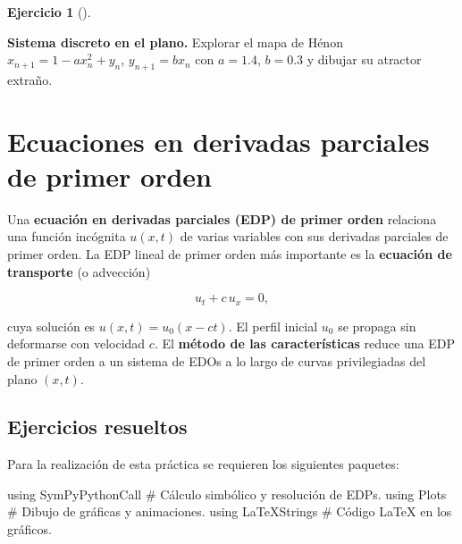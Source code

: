 \documentclass[
  spanish,
  a4paper,
]{scrreport}
\newenvironment{Shaded}{\begin{snugshade}}{\end{snugshade}}
\newcommand{\BuiltInTok}[1]{\textcolor[rgb]{0.00,0.23,0.31}{#1}}
\newcommand{\CommentTok}[1]{\textcolor[rgb]{0.37,0.37,0.37}{#1}}
\newcommand{\ImportTok}[1]{\textcolor[rgb]{0.00,0.46,0.62}{#1}}
\theoremstyle{definition}
\newtheorem{exercise}{Ejercicio}[chapter]
\theoremstyle{remark}
\begin{document}
\begin{exercise}[]\protect\hypertarget{exr-propuesto-henon}{}\label{exr-propuesto-henon}

\textbf{Sistema discreto en el plano.} Explorar el mapa de Hénon
\(x_{n+1} = 1 - a x_n^2 + y_n\), \(y_{n+1} = b x_n\) con \(a = 1.4\),
\(b = 0.3\) y dibujar su atractor extraño.

\end{exercise}


\chapter{Ecuaciones en derivadas parciales de primer
orden}\label{ecuaciones-en-derivadas-parciales-de-primer-orden}

Una \textbf{ecuación en derivadas parciales (EDP) de primer orden}
relaciona una función incógnita \(u(x, t)\) de varias variables con sus
derivadas parciales de primer orden. La EDP lineal de primer orden más
importante es la \textbf{ecuación de transporte} (o advección)

\[
u_t + c\,u_x = 0,
\]

cuya solución es \(u(x,t) = u_0(x - ct)\). El perfil inicial \(u_0\) se
propaga sin deformarse con velocidad \(c\). El \textbf{método de las
características} reduce una EDP de primer orden a un sistema de EDOs a
lo largo de curvas privilegiadas del plano \((x, t)\).

\section{Ejercicios resueltos}\label{ejercicios-resueltos-6}

Para la realización de esta práctica se requieren los siguientes
paquetes:

\begin{Shaded}
\begin{Highlighting}[]
\ImportTok{using} \BuiltInTok{SymPyPythonCall}   \CommentTok{\# Cálculo simbólico y resolución de EDPs.}
\ImportTok{using} \BuiltInTok{Plots}             \CommentTok{\# Dibujo de gráficas y animaciones.}
\ImportTok{using} \BuiltInTok{LaTeXStrings}      \CommentTok{\# Código LaTeX en los gráficos.}
\end{Highlighting}
\end{Shaded}
\end{document}
